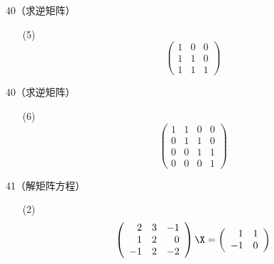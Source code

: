 \begin{frame}
  \begin{footnotesize}
    \begin{exampleblock}{40（求逆矩阵）}
      \begin{itemize}
      \item[(5)]
        $$
        \left(
        \begin{array}{rrr}
          1&0&0\\
          1&1&0\\
          1&1&1
        \end{array}
        \right)
        $$
      \end{itemize}
    \end{exampleblock}
  \end{footnotesize}
\end{frame}

\begin{frame}
  \begin{footnotesize}
    \begin{exampleblock}{40（求逆矩阵）}
      \begin{itemize}
      \item[(6)]
        $$
        \left(
        \begin{array}{rrrr}
          1&1&0&0\\
          0&1&1&0\\
          0&0&1&1\\
          0&0&0&1
        \end{array}
        \right)
        $$
      \end{itemize}
    \end{exampleblock}
  \end{footnotesize}
\end{frame}


\begin{frame}
  \begin{footnotesize}
    \begin{exampleblock}{41（解矩阵方程）}
      \begin{itemize}
      \item[(2)]
        $$
        \left(
        \begin{array}{rrr}
          2&3&-1\\
          1&2&0\\
          -1&2&-2
        \end{array}
        \right)\X=
        \left(
        \begin{array}{rr}
          1&1\\
          -1&0
        \end{array}
        \right)        
        $$
      \end{itemize}
    \end{exampleblock}
  \end{footnotesize}
\end{frame}

